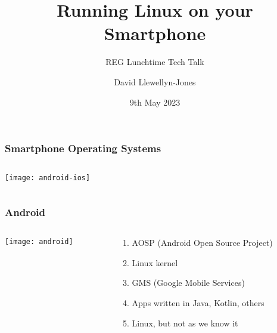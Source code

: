 \documentclass[
	notes=none,
	aspectratio=169
]{beamer}
\begin{document}
\title{Running Linux on your Smartphone}
\subtitle{REG Lunchtime Tech Talk}
\author{David Llewellyn-Jones}
\date{9th May 2023}


\renewcommand{\thefootnote}{\arabic{footnote}}

\frame{
\titlepage
}
\note{
}

\renewcommand{\thefootnote}{\fnsymbol{footnote}}


\begin{frame}
\frametitle{Smartphone Operating Systems}

\begin{columns}[T]
\begin{column}[T]{0.93\textwidth}

\vspace{1.0cm}
\texttt{[image: android-ios]}

\end{column}
\end{columns}

\end{frame}


\begin{frame}
\frametitle{Android}

\begin{columns}[T]
\begin{column}[T]{0.5\textwidth}

\vspace{1.0cm}
\hspace{2.14em}\texttt{[image: android]}

\end{column}

\begin{column}[T]{0.5\textwidth}
\setlength{\parskip}{0.5em}

\vspace{1.7cm}
\begin{enumerate}
\setlength{\parskip}{0.5em}
\item AOSP (Android Open Source Project)
\item Linux kernel
\item GMS (Google Mobile Services)
\item Apps written in Java, Kotlin, others
\item Linux, but not as we know it
\end{enumerate}

\end{column}
\end{columns}

\end{frame}
\note{
}
\end{document}
